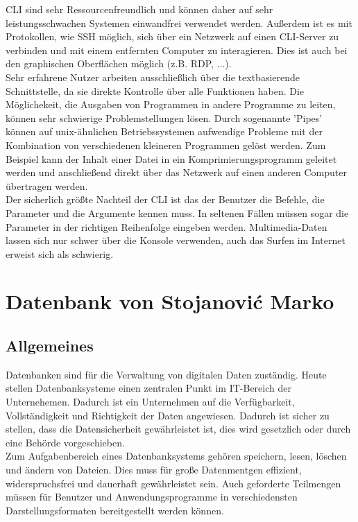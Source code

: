 \documentclass[12pt,a4paper]{report}
\begin{document}
CLI sind sehr Ressourcenfreundlich und können daher auf sehr leistungsschwachen Systemen einwandfrei verwendet werden. Außerdem ist es mit Protokollen, wie SSH möglich, sich über ein Netzwerk auf einen CLI-Server zu verbinden und mit einem entfernten Computer zu interagieren. Dies ist auch bei den graphischen Oberflächen möglich (z.B. RDP, ...).\\

Sehr erfahrene Nutzer arbeiten ausschließlich über die textbasierende Schnittstelle, da sie direkte Kontrolle über alle Funktionen haben. Die Möglichekeit, die Ausgaben von Programmen in andere Programme zu leiten, können sehr schwierige Problemstellungen lösen. Durch sogenannte 'Pipes' können auf unix-ähnlichen Betriebssystemen aufwendige Probleme mit der Kombination von verschiedenen kleineren Programmen gelöst werden. Zum Beispiel kann der Inhalt einer Datei in ein Komprimierungsprogramm geleitet werden und anschließend direkt über das Netzwerk auf einen anderen Computer übertragen werden.\\

Der sicherlich größte Nachteil der CLI ist das der Benutzer die Befehle, die Parameter und die Argumente kennen muss. In seltenen Fällen müssen sogar die Parameter in der richtigen Reihenfolge eingeben werden. Multimedia-Daten lassen sich nur schwer über die Konsole verwenden, auch das Surfen im Internet erweist sich als schwierig.\\

\chapter{Datenbank von Stojanovi\'{c} Marko}

\section{Allgemeines}
Datenbanken sind für die Verwaltung von digitalen Daten zuständig. Heute stellen Datenbanksysteme einen zentralen Punkt im IT-Bereich der Unternehemen. Dadurch ist ein Unternehmen auf die Verfügbarkeit, Vollständigkeit und Richtigkeit der Daten angewiesen. Dadurch ist sicher zu stellen, dass die Datensicherheit gewährleistet ist, dies wird gesetzlich oder durch eine Behörde vorgeschieben.\\

Zum Aufgabenbereich eines Datenbanksystems gehören speichern, lesen, löschen und ändern von Dateien. Dies muss für große Datenmentgen effizient, widerspruchsfrei und dauerhaft gewährleistet sein. Auch geforderte Teilmengen müssen für Benutzer und Anwendungsprogramme in verschiedensten Darstellungsformaten bereitgestellt werden können.
\end{document}
